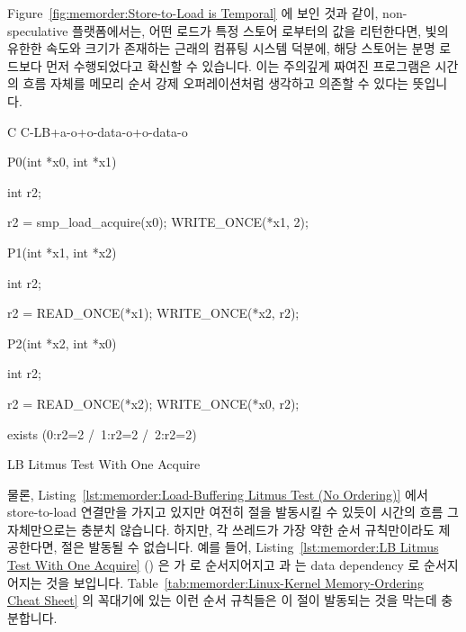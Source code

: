 Figure~\ref{fig:memorder:Store-to-Load is Temporal}
에 보인 것과 같이, non-speculative 플랫폼에서는, 어떤 로드가 특정 스토어
로부터의 값을 리턴한다면, 빛의 유한한 속도와 크기가 존재하는 근래의 컴퓨팅
시스템 덕분에, 해당 스토어는 분명 로드보다 먼저 수행되었다고 확신할 수
있습니다.
이는 주의깊게 짜여진 프로그램은 시간의 흐름 자체를 메모리 순서 강제
오퍼레이션처럼 생각하고 의존할 수 있다는 뜻입니다.

\begin{listing}[tbp]
{ \scriptsize
\begin{verbbox}[\LstLineNo]
C C-LB+a-o+o-data-o+o-data-o
{
}

P0(int *x0, int *x1)
{
  int r2;

  r2 = smp_load_acquire(x0);
  WRITE_ONCE(*x1, 2);
}


P1(int *x1, int *x2)
{
  int r2;

  r2 = READ_ONCE(*x1);
  WRITE_ONCE(*x2, r2);
}

P2(int *x2, int *x0)
{
  int r2;

  r2 = READ_ONCE(*x2);
  WRITE_ONCE(*x0, r2);
}

exists (0:r2=2 /\ 1:r2=2 /\ 2:r2=2)
\end{verbbox}
}
\centering
\theverbbox
\caption{LB Litmus Test With One Acquire}
\label{lst:memorder:LB Litmus Test With One Acquire}
\end{listing}

물론,
Listing~\ref{lst:memorder:Load-Buffering Litmus Test (No Ordering)}
에서 store-to-load 연결만을 가지고 있지만 여전히  절을 발동시킬 수
있듯이 시간의 흐름 그 자체만으로는 충분치 않습니다.
하지만, 각 쓰레드가 가장 약한 순서 규칙만이라도 제공한다면,  절은
발동될 수 없습니다.
예를 들어,
Listing~\ref{lst:memorder:LB Litmus Test With One Acquire}
()
은  가  로 순서지어지고  과 
는 data dependency 로 순서지어지는 것을 보입니다.
Table~\ref{tab:memorder:Linux-Kernel Memory-Ordering Cheat Sheet}
의 꼭대기에 있는 이런 순서 규칙들은 이  절이 발동되는 것을 막는데
충분합니다.
\iffalse

